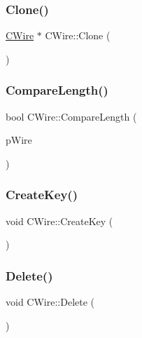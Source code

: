 \mbox{\label{classCWire_a79a2ddae76fd8d2e0a96309077d5a550}} 
\subsubsection{\texorpdfstring{Clone()}{Clone()}}
{\footnotesize\ttfamily \mbox{\hyperlink{classCWire}{C\+Wire}} $\ast$ C\+Wire\+::\+Clone (\begin{DoxyParamCaption}{ }\end{DoxyParamCaption})}

\mbox{\label{classCWire_a683449c62b5625b17a78f12274d4a601}} 
\subsubsection{\texorpdfstring{CompareLength()}{CompareLength()}}
{\footnotesize\ttfamily bool C\+Wire\+::\+Compare\+Length (\begin{DoxyParamCaption}\item[{\mbox{\hyperlink{classCWire}{C\+Wire}} $\ast$}]{p\+Wire }\end{DoxyParamCaption})}

\mbox{\label{classCWire_a6ed15ca71f29273eed927d88c87535b0}} 
\subsubsection{\texorpdfstring{CreateKey()}{CreateKey()}}
{\footnotesize\ttfamily void C\+Wire\+::\+Create\+Key (\begin{DoxyParamCaption}{ }\end{DoxyParamCaption})}

\mbox{\label{classCWire_abbcbc22230d8e5a87ac4de9cbf990022}} 
\subsubsection{\texorpdfstring{Delete()}{Delete()}}
{\footnotesize\ttfamily void C\+Wire\+::\+Delete (\begin{DoxyParamCaption}{ }\end{DoxyParamCaption})}

